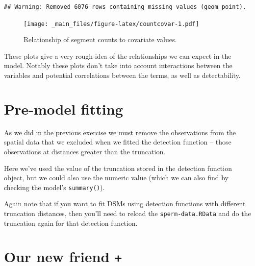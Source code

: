 \documentclass[]{book}
\newenvironment{Shaded}{\begin{snugshade}}{\end{snugshade}}
\newcommand{\StringTok}[1]{\textcolor[rgb]{0.31,0.60,0.02}{#1}}
\newcommand{\OperatorTok}[1]{\textcolor[rgb]{0.81,0.36,0.00}{\textbf{#1}}}
\newcommand{\NormalTok}[1]{#1}
\theoremstyle{definition}
\theoremstyle{definition}
\theoremstyle{remark}
\begin{document}
\begin{verbatim}
## Warning: Removed 6076 rows containing missing values (geom_point).
\end{verbatim}

\begin{figure}
\centering
\texttt{[image: \_main\_files/figure-latex/countcovar-1.pdf]}
\caption{\label{fig:countcovar}Relationship of segment counts to covariate
values.}
\end{figure}

These plots give a very rough idea of the relationships we can expect in
the model. Notably these plots don't take into account interactions
between the variables and potential correlations between the terms, as
well as detectability.

\section{Pre-model fitting}\label{pre-model-fitting-1}

As we did in the previous exercise we must remove the observations from
the spatial data that we excluded when we fitted the detection function
-- those observations at distances greater than the truncation.

\begin{Shaded}
\end{Shaded}

Here we've used the value of the truncation stored in the detection
function object, but we could also use the numeric value (which we can
also find by checking the model's \texttt{summary()}).

Again note that if you want to fit DSMs using detection functions with
different truncation distances, then you'll need to reload the
\texttt{sperm-data.RData} and do the truncation again for that detection
function.

\section{\texorpdfstring{Our new friend
\texttt{+}}{Our new friend +}}\label{our-new-friend}
\end{document}
